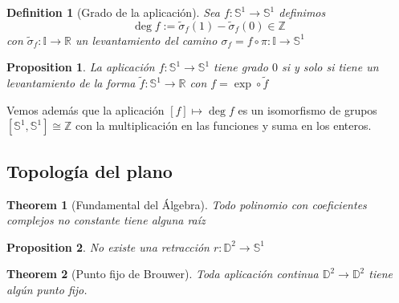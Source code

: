 \documentclass{myclass}
\newtheorem*{definition}{Definition}
\newtheorem*{theorem}{Theorem}
\newtheorem*{proposition}{Proposition}
\begin{document}
\begin{minipage}{0.8\textwidth}
\begin{definition}[Grado de la aplicación] Sea $f:\mathbb{S}^1 \to  \mathbb{S}^1$ definimos
  \[
  \deg f:= \tilde{\sigma }_f(1) - \tilde{\sigma }_f(0) \in \mathbb{Z}
  \] 
  con $\tilde{\sigma }_f:\mathbb{I} \to  \mathbb{R}$ un levantamiento del camino $\sigma _f = f \circ \pi : \mathbb{I} \to  \mathbb{S}^1$
\end{definition}
\end{minipage}
\begin{minipage}{0.2\textwidth}
\end{minipage}

\begin{proposition}
La aplicación $f:  \mathbb{S}^1 \to  \mathbb{S}^1 $ tiene grado $0$ si y solo si tiene un levantamiento de la forma $\tilde{f}: \mathbb{S}^1 \to  \mathbb{R}$ con $f=\exp \circ \tilde{f}$
\end{proposition}

Vemos además que la aplicación $[f] \mapsto \deg f$ es un isomorfismo de grupos $[\mathbb{S}^1, \mathbb{S}^1] \cong \mathbb{Z}$ con la multiplicación en las funciones y suma en los enteros.

\subsection{Topología del plano}
\begin{theorem}[Fundamental del Álgebra] Todo polinomio con coeficientes complejos no constante tiene alguna raíz
\end{theorem}

\begin{proposition}
No existe una retracción $r:\mathbb{D}^2 \to \mathbb{S}^1$
\end{proposition}

\begin{theorem}[Punto fijo de Brouwer]
Toda aplicación continua $\mathbb{D}^2 \to \mathbb{D}^2$ tiene algún punto fijo.
\end{theorem}
\end{document}
